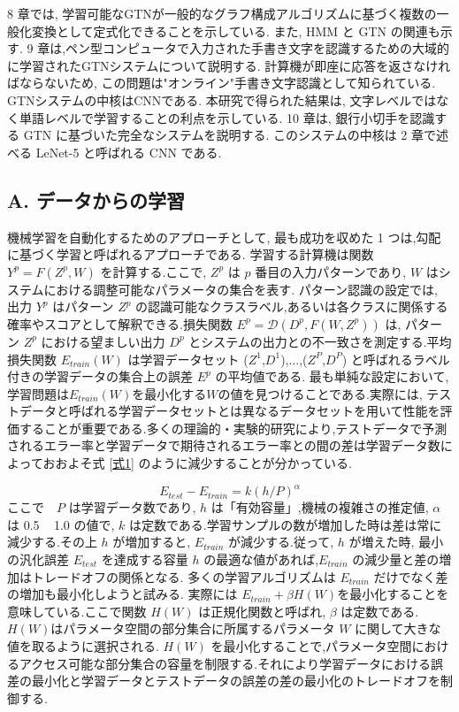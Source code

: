 \documentclass[twocolumn]{jarticle}     %
\begin{document}
8 章では, 学習可能なGTNが一般的なグラフ構成アルゴリズムに基づく複数の一般化変換として定式化できることを示している.
また, HMM と GTN の関連も示す.
9 章は,ペン型コンピュータで入力された手書き文字を認識するための大域的に学習されたGTNシステムについて説明する.
計算機が即座に応答を返さなければならないため, この問題は"オンライン"手書き文字認識として知られている. GTNシステムの中核はCNNである. 本研究で得られた結果は, 文字レベルではなく単語レベルで学習することの利点を示している.
10 章は, 銀行小切手を認識する GTN に基づいた完全なシステムを説明する. このシステムの中核は 2 章で述べる LeNet-5 と呼ばれる CNN である.

\subsection*{A. データからの学習}
機械学習を自動化するためのアプローチとして, 最も成功を収めた 1 つは,勾配に基づく学習と呼ばれるアプローチである.
学習する計算機は関数 $Y^p = F(Z^p,W)$ を計算する.ここで, $Z^p$ は $p$ 番目の入力パターンであり, $W$ はシステムにおける調整可能なパラメータの集合を表す.
パターン認識の設定では, 出力 $Y^p$ はパターン $Z^p$ の認識可能なクラスラベル,あるいは各クラスに関係する確率やスコアとして解釈できる.損失関数 $E^p = \mathcal{D}(D^p,F(W,Z^p))$ は, パターン $Z^p$ における望ましい出力 $D^p$ とシステムの出力との不一致さを測定する.平均損失関数 $E_{train}(W)$ は学習データセット {($Z^1$,$D^1$),...,($Z^P$,$D^P$)} と呼ばれるラベル付きの学習データの集合上の誤差 $E^p$ の平均値である.
最も単純な設定において,学習問題は$E_{train}(W)$を最小化する$W$の値を見つけることである.実際には, テストデータと呼ばれる学習データセットとは異なるデータセットを用いて性能を評価することが重要である.多くの理論的・実験的研究により,テストデータで予測されるエラー率と学習データで期待されるエラー率との間の差は学習データ数によっておおよそ式 \ref{式1} のように減少することが分かっている. 

\begin{equation}
  E_{test} - E_{train} = k({h}/{P})^\alpha
  \label{式1}
\end{equation}
ここで　$P$ は学習データ数であり, 
$h$ は「有効容量」,機械の複雑さの推定値, $\alpha$ は 0.5 ~ 1.0 の値で, $k$ は定数である.学習サンプルの数が増加した時は差は常に減少する.その上 $h$ が増加すると, $E_{train}$ が減少する.従って, $h$ が増えた時, 最小の汎化誤差 $E_{test}$ を達成する容量 $h$ の最適な値があれば,$E_{train}$ の減少量と差の増加はトレードオフの関係となる.
多くの学習アルゴリズムは $E_{train}$ だけでなく差の増加も最小化しようと試みる. 実際には $E_{train} + \beta H(W)$を最小化することを意味している.ここで関数 $H(W)$ は正規化関数と呼ばれ, $\beta$ は定数である. $H(W)$はパラメータ空間の部分集合に所属するパラメータ $W$ に関して大きな値を取るように選択される. $H(W)$ を最小化することで,パラメータ空間におけるアクセス可能な部分集合の容量を制限する.それにより学習データにおける誤差の最小化と学習データとテストデータの誤差の差の最小化のトレードオフを制御する.
\end{document}
